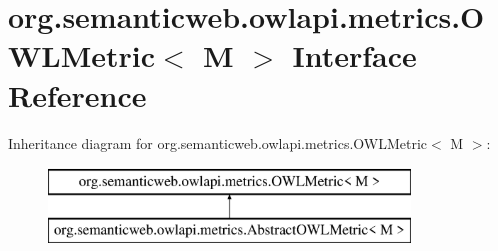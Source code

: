 \hypertarget{interfaceorg_1_1semanticweb_1_1owlapi_1_1metrics_1_1_o_w_l_metric_3_01_m_01_4}{\section{org.\-semanticweb.\-owlapi.\-metrics.\-O\-W\-L\-Metric$<$ M $>$ Interface Reference}
\label{interfaceorg_1_1semanticweb_1_1owlapi_1_1metrics_1_1_o_w_l_metric_3_01_m_01_4}
}
Inheritance diagram for org.\-semanticweb.\-owlapi.\-metrics.\-O\-W\-L\-Metric$<$ M $>$\-:\begin{figure}[H]
\begin{center}
\leavevmode
\includegraphics[height=2.000000cm]{interfaceorg_1_1semanticweb_1_1owlapi_1_1metrics_1_1_o_w_l_metric_3_01_m_01_4}
\end{center}
\end{figure}
